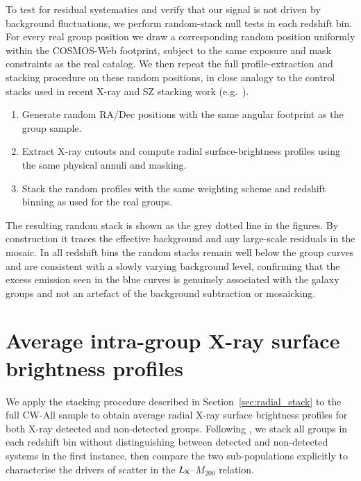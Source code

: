 \documentclass{aa}
\begin{document}
\begin{appendix}
To test for residual systematics and verify that our signal is not driven by background fluctuations, we perform random-stack null tests in each redshift bin. For every real group position we draw a corresponding random position uniformly within the COSMOS-Web footprint, subject to the same exposure and mask constraints as the real catalog. We then repeat the full profile-extraction and stacking procedure on these random positions, in close analogy to the control stacks used in recent X-ray and SZ stacking work (e.g.\ \citealt{Anderson2015,PlanckCollaboration2013,Popesso2025}).
\begin{enumerate}
\item Generate random RA/Dec positions with the same angular footprint as the group sample.
\item Extract X-ray cutouts and compute radial surface-brightness profiles using the same physical annuli and masking.
\item Stack the random profiles with the same weighting scheme and redshift binning as used for the real groups.
\end{enumerate}
The resulting random stack is shown as the grey dotted line in the figures. By construction it traces the effective background and any large-scale residuals in the mosaic. In all redshift bins the random stacks remain well below the group curves and are consistent with a slowly varying background level, confirming that the excess emission seen in the blue curves is genuinely associated with the galaxy groups and not an artefact of the background subtraction or mosaicking.

\section{Average intra-group X-ray surface brightness profiles}
\label{sec:avg_profiles}

We apply the stacking procedure described in Section~\ref{sec:radial_stack} to
the full CW-All sample to obtain average radial X-ray surface brightness
profiles for both X-ray detected and non-detected groups.
Following \citet{Popesso2025}, we stack all groups in each redshift bin without
distinguishing between detected and non-detected systems in the first instance,
then compare the two sub-populations explicitly to characterise the drivers of
scatter in the $L_{\rm X}$--$M_{200}$ relation.


\end{appendix}
\end{document}
